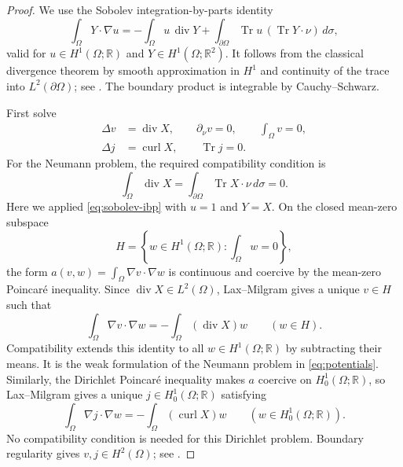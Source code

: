 \begin{proof}
We use the Sobolev integration-by-parts identity
\begin{equation}\label{eq:sobolev-ibp}
 \int_\Omega Y\cdot\nabla u
 =-\int_\Omega u\,\operatorname{div}Y
   +\int_{\partial\Omega}\operatorname{Tr}u\,
        (\operatorname{Tr}Y\cdot\nu)\,d\sigma,
\end{equation}
valid for $u\in H^1(\Omega;\mathbb R)$ and
$Y\in H^1(\Omega;\mathbb R^2)$. It follows from the classical divergence
theorem by smooth approximation in $H^1$ and continuity of the trace
into $L^2(\partial\Omega)$; see \cite[Theorem 1.46, Theorem 3.44,
and Section 3.11]{Hunter}. The boundary product is integrable by
Cauchy--Schwarz.

First solve
\begin{equation}\label{eq:potentials}
 \begin{aligned}
 \Delta v&=\operatorname{div}X,\qquad
 \partial_\nu v=0,\qquad \int_\Omega v=0,\\
 \Delta j&=\operatorname{curl}X,\qquad \operatorname{Tr}j=0.
 \end{aligned}
\end{equation}
For the Neumann problem, the required compatibility condition is
\[
 \int_\Omega\operatorname{div}X
 =\int_{\partial\Omega}\operatorname{Tr}X\cdot\nu\,d\sigma=0.
\]
Here we applied \cref{eq:sobolev-ibp} with $u=1$ and $Y=X$.
On the closed mean-zero subspace
\[
 H=\left\{w\in H^1(\Omega;\mathbb R):\int_\Omega w=0\right\},
\]
the form $a(v,w)=\int_\Omega\nabla v\cdot\nabla w$ is continuous and
coercive by the mean-zero Poincar\'e inequality. Since
$\operatorname{div}X\in L^2(\Omega)$, Lax--Milgram
\cite[Theorem 4.20, p.~103]{Hunter} gives a unique $v\in H$ such that
\[
 \int_\Omega\nabla v\cdot\nabla w
 =-\int_\Omega(\operatorname{div}X)w\qquad(w\in H).
\]
Compatibility extends this identity to all $w\in H^1(\Omega;\mathbb R)$
by subtracting their means. It is the weak formulation of the Neumann
problem in \cref{eq:potentials}.
Similarly, the Dirichlet Poincar\'e inequality makes $a$ coercive on
$H_0^1(\Omega;\mathbb R)$, so Lax--Milgram gives a unique
$j\in H_0^1(\Omega;\mathbb R)$ satisfying
\[
 \int_\Omega\nabla j\cdot\nabla w
 =-\int_\Omega(\operatorname{curl}X)w
 \qquad(w\in H_0^1(\Omega;\mathbb R)).
\]
No compatibility condition is needed for this Dirichlet problem.
Boundary regularity gives $v,j\in H^2(\Omega)$; see
\cite[Chapter III, Theorems 6.1 and 6.4]{Showalter}.


\end{proof}
